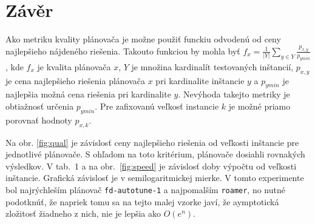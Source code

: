 \documentclass[a4paper,journal]{IEEEtran}
\begin{document}
\section{Z\'av\v er}
 Ako metriku kvality pl\'anova\v ca je mo\v zne pou\v zi\v t funckiu odvoden\'u od ceny najlep\v sieho n\'ajden\'eho rie\v senia. Takouto funkciou by mohla by\v t
 $f_x = \frac{1}{\left|{Y}\right|}\sum_{y \in Y} \frac{p_{x,y}}{p_{ymin}}$, kde $f_x$ je kvalita pl\'anova\v ca $x$, $Y$ je mno\v zina kardinal\'it testovan\'ych in\v stanci\'i, 
 $p_{x,y}$ je cena najlep\v sieho rie\v senia pl\'anova\v ca $x$ pri kardinalite in\v stancie $y$ a $p_{ymin}$ je najlep\v sia mo\v zn\'a cena rie\v senia
 pri kardinalite $y$. Nev\'yhoda takejto metriky je obtia\v znos\v t ur\v cenia  $p_{ymin}$. Pre zafixovan\'u ve\v lkos\v t instancie $k$ je mo\v zn\'e priamo porovna\v t
 hodnoty $p_{x,k}$.
 
 Na obr. \ref{fig:qual} je z\'avislos\v t ceny najlep\v sieho rie\v senia od ve\v lkosti in\v stancie pre jednotliv\'e pl\'anova\v ce.
 S oh\v ladom na toto krit\'erium, pl\'anova\v ce dosiahli rovnak\'ych v\'ysledkov.
 V tab.~1 a na  obr.~\ref{fig:speed} je z\'avislos\v t doby v\'ypo\v ctu od ve\v lkosti in\v stancie. Grafick\'a z\'avislos\v t je v semilogaritmickej 
 mierke. V tomto experimente bol najr\'ychle\v s\'im pl\'anova\v c \texttt{fd-autotune-1} a najpomal\v s\'im \texttt{roamer}, no nutn\'e podotkn\'u\v t, 
 \v ze napriek tomu sa na tejto malej vzorke jav\'i, \v ze aymptotick\'a zlo\v zitos\v t \v ziadneho z nich, nie je lep\v sia ako $O(e^n)$.
 
 
 

%


\end{document}

